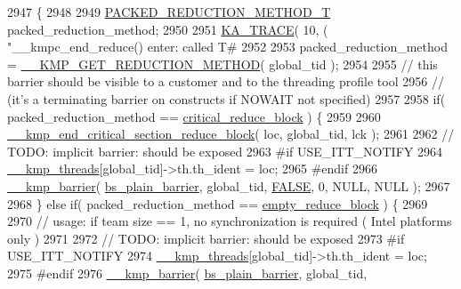 \begin{DoxyCode}
2947                                                                                 \{
2948 
2949     \hyperlink{kmp_8h_a79cdcd03cc0f2498719630411d56ef84}{PACKED\_REDUCTION\_METHOD\_T} packed\_reduction\_method;
2950 
2951     \hyperlink{kmp__debug_8h_a21d51f37cb197aca5ffe737531678830}{KA\_TRACE}( 10, ( \textcolor{stringliteral}{"\_\_kmpc\_end\_reduce() enter: called T#%
2952 
2953     packed\_reduction\_method = \hyperlink{kmp__csupport_8c_a1f238c550ed76a4c6ce263adba8c3524}{\_\_KMP\_GET\_REDUCTION\_METHOD}( global\_tid );
2954 
2955     \textcolor{comment}{// this barrier should be visible to a customer and to the threading profile tool}
2956     \textcolor{comment}{//              (it's a terminating barrier on constructs if NOWAIT not specified)}
2957 
2958     \textcolor{keywordflow}{if}( packed\_reduction\_method == \hyperlink{kmp_8h_aef090e4cbee673db380b81f6deb8e306a2c5ad9d5d2b242bce894255d63ee550e}{critical\_reduce\_block} ) \{
2959 
2960         \hyperlink{kmp__csupport_8c_a601983b17f27442206a77b8781579708}{\_\_kmp\_end\_critical\_section\_reduce\_block}( loc, global\_tid, 
      lck );
2961 
2962         \textcolor{comment}{// TODO: implicit barrier: should be exposed}
2963 \textcolor{preprocessor}{#if USE\_ITT\_NOTIFY}
2964 \textcolor{preprocessor}{}        \hyperlink{kmp_8h_a8ba907eb5a2568ff55a49a1504cd3624}{\_\_kmp\_threads}[global\_tid]->th.th\_ident = loc;
2965 \textcolor{preprocessor}{#endif}
2966 \textcolor{preprocessor}{}        \hyperlink{kmp_8h_a2db240b744f3af1eb8413df50dbe6118}{\_\_kmp\_barrier}( \hyperlink{kmp_8h_ad0f7c21f2f1d446087ef5714eb0fd8cfa364ac8fcf1df87a7d5793a693f2e4051}{bs\_plain\_barrier}, global\_tid, 
      \hyperlink{kmp_8h_aa93f0eb578d23995850d61f7d61c55c1}{FALSE}, 0, NULL, NULL );
2967 
2968     \} \textcolor{keywordflow}{else} \textcolor{keywordflow}{if}( packed\_reduction\_method == \hyperlink{kmp_8h_aef090e4cbee673db380b81f6deb8e306a28cf3671c5c01e773c7040204b6e8bb5}{empty\_reduce\_block} ) \{
2969 
2970         \textcolor{comment}{// usage: if team size == 1, no synchronization is required ( Intel platforms only )}
2971 
2972         \textcolor{comment}{// TODO: implicit barrier: should be exposed}
2973 \textcolor{preprocessor}{#if USE\_ITT\_NOTIFY}
2974 \textcolor{preprocessor}{}        \hyperlink{kmp_8h_a8ba907eb5a2568ff55a49a1504cd3624}{\_\_kmp\_threads}[global\_tid]->th.th\_ident = loc;
2975 \textcolor{preprocessor}{#endif}
2976 \textcolor{preprocessor}{}        \hyperlink{kmp_8h_a2db240b744f3af1eb8413df50dbe6118}{\_\_kmp\_barrier}( \hyperlink{kmp_8h_ad0f7c21f2f1d446087ef5714eb0fd8cfa364ac8fcf1df87a7d5793a693f2e4051}{bs\_plain\_barrier}, global\_tid, 
}
\end{DoxyCode}
